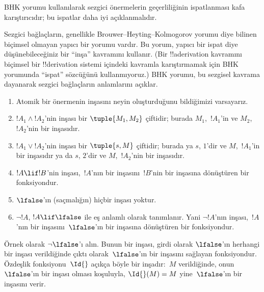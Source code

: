 



\begin{editorial}
  BHK yorumu kullanılarak sezgici önermelerin geçerliliğinin ispatlanması
  kafa karıştırıcıdır; bu ispatlar daha iyi açıklanmalıdır.
\end{editorial}

Sezgici bağlaçların, genellikle Brouwer--Heyting--Kolmogorov yorumu diye
bilinen biçimsel olmayan yapıcı bir yorumu vardır. Bu yorum, yapıcı bir ispat
diye düşünebileceğiniz bir ``inşa'' kavramını kullanır. (Bir !!a{derivation}
kavramını biçimsel bir !!{derivation} sistemi içindeki kavramla karıştırmamak
için BHK yorumunda ``ispat'' sözcüğünü kullanmıyoruz.) BHK yorumu, bu sezgisel
kavrama dayanarak sezgici bağlaçların anlamlarını açıklar.

\begin{enumerate}
\item Atomik bir önermenin inşasını neyin oluşturduğunu bildiğimizi varsayarız.
\item $!A_1 \land !A_2$'nin inşası bir $\tuple{M_1, M_2}$ çiftidir; burada
  $M_1$,~$!A_1$'in ve $M_2$,~$!A_2$'nin bir inşasıdır.
\item $!A_1 \lor !A_2$'nin inşası bir $\tuple{s, M}$ çiftidir; burada ya $s$,
  $1$'dir ve $M$,~$!A_1$'in bir inşasıdır ya da $s$, $2$'dir ve $M$,~$!A_2$'nin
  bir inşasıdır.
\item $!A \lif !B$'nin inşası,~$!A$'nın bir inşasını~$!B$'nin bir inşasına
  dönüştüren bir fonksiyondur.
\item $\lfalse$'ın (saçmalığın) hiçbir inşası yoktur.
\item $\lnot !A$, $!A \lif \lfalse$ ile eş anlamlı olarak tanımlanır. Yani
  $\lnot !A$'nın inşası,~$!A$'nın bir inşasını~$\lfalse$'ın bir inşasına
  dönüştüren bir fonksiyondur.
\end{enumerate}

\begin{ex}
Örnek olarak $\lnot \lfalse$'ı alın. Bunun bir inşası, girdi olarak
$\lfalse$'ın herhangi bir inşası verildiğinde çıktı olarak~$\lfalse$'ın bir
inşasını sağlayan fonksiyondur. Özdeşlik fonksiyonu~$\Id{}$ açıkça böyle bir
inşadır:~$M$ verildiğinde, onun~$\lfalse$'ın bir inşası olması koşuluyla,
$\Id{}(M) = M$ yine~$\lfalse$'ın bir inşasını verir.
\end{ex}

